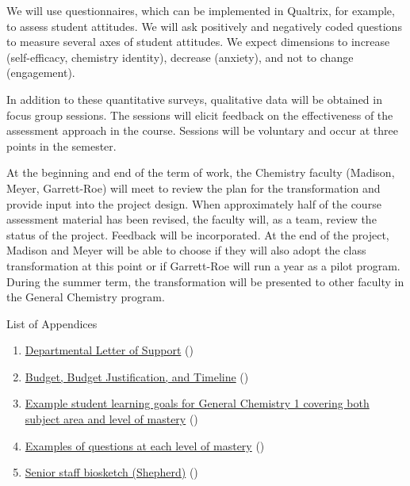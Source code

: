 \documentclass[10pt,letterpaper]{article}
\begin{document}
 We will use questionnaires, which can be implemented in Qualtrix, for example, to assess student attitudes. We will ask positively and negatively coded questions to measure several axes of student attitudes. We expect  dimensions to increase (self-efficacy, chemistry identity), decrease (anxiety), and not to change (engagement). 

 In addition to these quantitative surveys, qualitative data will be obtained in focus group sessions. The sessions will elicit feedback on the effectiveness of the assessment approach in the course. Sessions will be voluntary and occur at three points in the semester.

At the beginning and end of the term of work, the \pogil Chemistry faculty (Madison, Meyer, Garrett-Roe) will meet to review the plan for the transformation and provide input into the project design. When approximately half of the course assessment material has been revised, the \pogil faculty will, as a team, review the status of the project. Feedback will be incorporated. At the end of the project, Madison and Meyer will be able to choose if they will also adopt the class transformation at this point or if Garrett-Roe will run a year as a pilot program. During the summer term, the transformation will be presented to other faculty in the General Chemistry program.

\newpage
{}
List of Appendices
\begin{enumerate}
\item \hyperref[app:letter]{Departmental Letter of Support} ()
\item \hyperref[app:budget]{Budget, Budget Justification, and Timeline} ()
\item \hyperref[app:learning_objectives]{Example student learning goals for General Chemistry 1 covering both subject area and level of mastery} ()
\item \hyperref[app:example_questions]{Examples of questions at each level of mastery} ()
\item \hyperref[app:shepherd_biosketch]{Senior staff biosketch (Shepherd)} ()
\end{enumerate}
\end{document}
